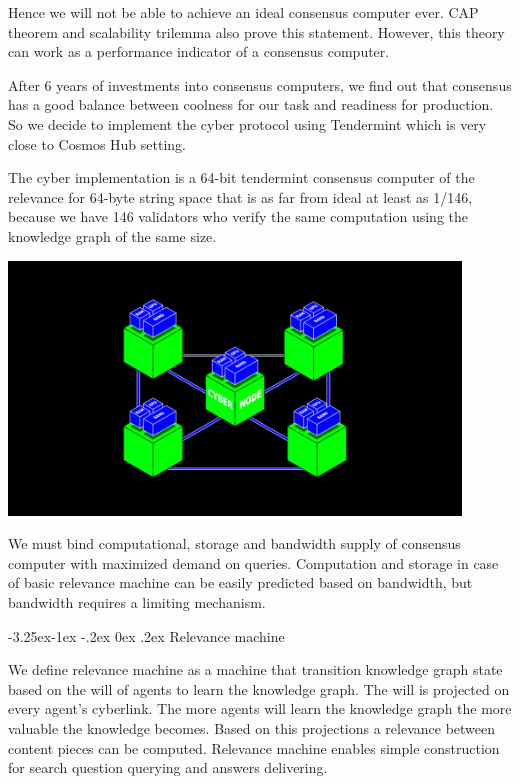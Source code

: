 \documentclass[8pt,oneside]{amsart}
\makeatletter
\newcommand{\linkgreen}[2]{\href{#1}{\color{green}{#2}}}
\renewcommand\subsection{\@startsection{subsection}{2}{\z@}%
                                     {-3.25ex\@plus -1ex \@minus -.2ex}%
                                     {0ex \@plus .2ex}%
                                     {\play\Large}}%
\newcommand{\titleSection}[1]{\subsection{#1}}
\newcommand{\code}[1]{{\PlayBold #1}}
\newenvironment{Figure}
  {\par\medskip\noindent\minipage{\linewidth}}
  {\endminipage\par\medskip}
\makeatother
\begin{document}
Hence we will not be able to achieve an ideal consensus computer ever. CAP theorem and scalability trilemma also prove this statement. However, this theory can work as a performance indicator of a consensus computer.

After 6 years of investments into consensus computers, we find out that \linkgreen{https://ipfs.io/ipfs/QmaMtD7xDgghqgjN62zWZ5TBGFiEjGQtuZBjJ9sMh816KJ}{Tendermint} consensus has a good balance between coolness for our task and readiness for production. So we decide to implement the \code{cyber} protocol using Tendermint which is very close to Cosmos Hub setting.

The \code{cyber} implementation is a 64-bit tendermint consensus computer of the relevance for 64-byte string space that is as far from ideal at least as 1/146, because we have 146 validators who verify the same computation using the knowledge graph of the same size.

\begin{Figure}
  \centering
  \includegraphics[width=0.9\textwidth]{computer.png}
\end{Figure}

We must bind computational, storage and bandwidth supply of consensus computer with maximized demand on queries. Computation and storage in case of basic relevance machine can be easily predicted based on bandwidth, but bandwidth requires a limiting mechanism.

\titleSection{Relevance machine}\label{relevance-machine}

We define relevance machine as a machine that transition knowledge graph state based on the will of agents to learn the knowledge graph. The will is projected on every agent's cyberlink. The more agents will learn the knowledge graph the more valuable the knowledge becomes. Based on this projections a relevance between content pieces can be computed. Relevance machine enables simple construction for search question querying and answers delivering.
\end{document}
